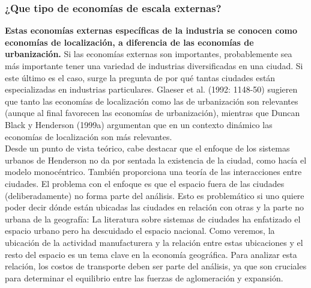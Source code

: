 \subsubsection{¿Que tipo de economías de escala externas?}
\textbf{Estas economías externas específicas de la industria se conocen como economías de localización, a diferencia de las economías de urbanización.} Si las economías externas son importantes, probablemente sea más importante tener una variedad de industrias diversificadas en una ciudad. Si este último es el caso, surge la pregunta de por qué tantas ciudades están especializadas en industrias particulares. Glaeser et al. (1992: 1148-50) sugieren que tanto las economías de localización como las de urbanización son relevantes (aunque al final favorecen las economías de urbanización), mientras que Duncan Black y Henderson (1999a) argumentan que en un contexto dinámico las economías de localización son más relevantes.\\
Desde un punto de vista teórico, cabe destacar que el enfoque de los sistemas urbanos de Henderson no da por sentada la existencia de la ciudad, como hacía el modelo monocéntrico. También proporciona una teoría de las interacciones entre ciudades. El problema con el enfoque es que el espacio fuera de las ciudades (deliberadamente) no forma parte del análisis. Esto es problemático si uno quiere poder decir dónde están ubicadas las ciudades en relación con otras y la parte no urbana de la geografía: La literatura sobre sistemas de ciudades ha enfatizado el espacio urbano pero ha descuidado el espacio nacional. Como veremos, la ubicación de la actividad manufacturera y la relación entre estas ubicaciones y el resto del espacio es un tema clave en la economía geográfica. Para analizar esta relación, los costos de transporte deben ser parte del análisis, ya que son cruciales para determinar el equilibrio entre las fuerzas de aglomeración y expansión. \\
